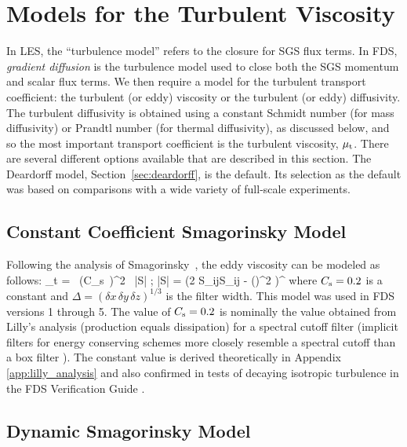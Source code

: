 \newpage
\section{Models for the Turbulent Viscosity}
\label{section:turbulent_viscosity}

In LES, the ``turbulence model'' refers to the closure for SGS flux terms.  In FDS, \emph{gradient diffusion} is the turbulence model used to close both the SGS momentum and scalar flux terms.  We then require a model for the turbulent transport coefficient: the turbulent (or eddy) viscosity or the turbulent (or eddy) diffusivity.  The turbulent diffusivity is obtained using a constant Schmidt number (for mass diffusivity) or Prandtl number (for thermal diffusivity), as discussed below, and so the most important transport coefficient is the turbulent viscosity, $\mu_{\rm t}$. There are several different options available that are described in this section. The Deardorff model, Section~\ref{sec:deardorff}, is the default. Its selection as the default was based on comparisons with a wide variety of full-scale experiments.

\subsection{Constant Coefficient Smagorinsky Model}

Following the analysis of Smagorinsky~\cite{Smagorinsky:1}, the eddy viscosity can be modeled as follows:
\be
\mu_t = \rho \, (C_{\rm s}\, \Delta)^2 \, |S| \label{constant_coef_LES} \quad ; \quad |S| = \left(2 S_{ij}S_{ij} -  (\nabla\!\cdot \bu)^2 \right)^\ha
\ee
where $C_{\rm s}=0.2$ is a constant and $\Delta = (\delta x \, \delta y \, \delta z)^{1/3}$ is the filter width. This model was used in FDS versions 1 through 5.  The value of $C_{\rm s}=0.2$ is nominally the value obtained from Lilly's analysis \cite{Lilly:1967} (production equals dissipation) for a spectral cutoff filter (implicit filters for energy conserving schemes more closely resemble a spectral cutoff than a box filter \cite{McDermott:2005b}).  The constant value is derived theoretically in Appendix \ref{app:lilly_analysis} and also confirmed in tests of decaying isotropic turbulence in the FDS Verification Guide \cite{FDS_Verification_Guide}.

\subsection{Dynamic Smagorinsky Model}

